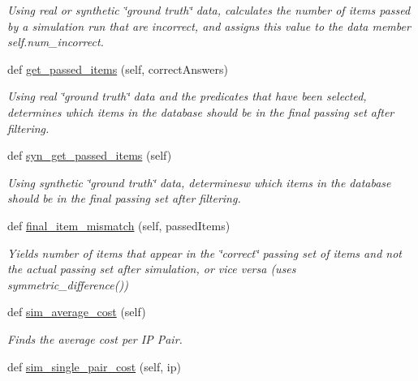 \begin{DoxyCompactItemize}
\begin{DoxyCompactList}\small\item\em Using real or synthetic \char`\"{}ground truth\char`\"{} data, calculates the number of items passed by a simulation run that are incorrect, and assigns this value to the data member self.\+num\+\_\+incorrect. \end{DoxyCompactList}\item 
def \mbox{\hyperlink{classdynamicfilterapp_1_1test__simulations_1_1_simulation_test_a7c7a6eb7abd732121d6b150823fbd1d2}{get\+\_\+passed\+\_\+items}} (self, correct\+Answers)
\begin{DoxyCompactList}\small\item\em Using real \char`\"{}ground truth\char`\"{} data and the predicates that have been selected, determines which items in the database should be in the final passing set after filtering. \end{DoxyCompactList}\item 
def \mbox{\hyperlink{classdynamicfilterapp_1_1test__simulations_1_1_simulation_test_a33fcff5dca045189c9ed364d42956b29}{syn\+\_\+get\+\_\+passed\+\_\+items}} (self)
\begin{DoxyCompactList}\small\item\em Using synthetic \char`\"{}ground truth\char`\"{} data, determinesw which items in the database should be in the final passing set after filtering. \end{DoxyCompactList}\item 
def \mbox{\hyperlink{classdynamicfilterapp_1_1test__simulations_1_1_simulation_test_ae535f7d0761a00bc82b9fdcd19556403}{final\+\_\+item\+\_\+mismatch}} (self, passed\+Items)
\begin{DoxyCompactList}\small\item\em Yields number of items that appear in the \char`\"{}correct\char`\"{} passing set of items and not the actual passing set after simulation, or vice versa (uses symmetric\+\_\+difference()) \end{DoxyCompactList}\item 
def \mbox{\hyperlink{classdynamicfilterapp_1_1test__simulations_1_1_simulation_test_ae3108f4ec1a39e163c4fc07f11b63c15}{sim\+\_\+average\+\_\+cost}} (self)
\begin{DoxyCompactList}\small\item\em Finds the average cost per IP Pair. \end{DoxyCompactList}\item 
def \mbox{\hyperlink{classdynamicfilterapp_1_1test__simulations_1_1_simulation_test_abf3ff009ae041f4856e34b301c551224}{sim\+\_\+single\+\_\+pair\+\_\+cost}} (self, ip)

\end{DoxyCompactItemize}
